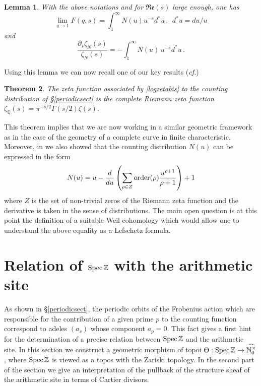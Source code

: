 \documentclass[noams,lp]{compositio}
\newtheorem{thm}{Theorem}[section] %
\newtheorem{lem}[thm]{Lemma}
\def\Spec{{\rm Spec\,}}
\def\N{{\mathbb N}}
\def\Q{{\mathbb Q}}
\def\Z{{\mathbb Z}}
\newcommand{\cf}{{\it cf.}}
\def\nto{\N_0^{\times}}
\def\wnto{{\widehat{\nto}}}
\begin{document}
\begin{lem} \label{compute1}With the above notations and for $\Re\mathfrak e(s)$ large enough, one has
\begin{equation}\label{lim}
    \lim_{q\to 1} F(q,s) = \int_1^\infty N(u)u^{-s}d^*u\,,\ \ d^*u=du/u
\end{equation}
and
\begin{equation}\label{logzetabis}
    \frac{\partial_s\zeta_N(s)}{\zeta_N(s)}=-\int_1^\infty  N(u)\, u^{-s}d^*u\,.
\end{equation}
\end{lem}
Using this lemma we can now recall one of our key results (\cf \cite{CC1, CC2})
\begin{thm}\label{mainthm} The zeta function associated by \eqref{logzetabis} to the counting distribution of \S \ref{periodicsect} is the  {\em complete} Riemann zeta function  $\zeta_\Q(s)=\pi^{-s/2}\Gamma(s/2)\zeta(s)$.
\end{thm}

This theorem implies that we are now working in a similar geometric framework as in the case of the geometry of a complete curve in finite characteristic. Moreover, in \cite{CC1} we also showed that the counting distribution $N(u)$ can be expressed in the form
 $$
N(u)=u-\frac{d}{du}\left(\sum_{\rho\in Z}{\rm order}(\rho)\frac{u^{\rho+1}}{\rho+1}\right)+1
$$
where $Z$ is the set of non-trivial zeros of the Riemann zeta function and the derivative is taken in the sense of  distributions. The main open question is at this point the definition of a suitable Weil cohomology which would allow one to understand the above equality as a Lefschetz formula.

\section{Relation of $\Spec\Z$ with the arithmetic site}\label{sectspz0}

As shown in \S \ref{periodicsect}, the periodic orbits of the Frobenius action which are responsible for the contribution of a given prime $p$ to the counting function correspond to adeles $(a_v)$ whose component $a_p=0$. This fact gives a first hint for the determination of  a precise relation between  $\Spec\Z$ and the arithmetic site. In this section we construct a geometric morphism of topoi $\Theta: \Spec\Z\to \wnto$, where $\Spec\Z$ is viewed as a topos with the Zariski topology. In the second part of the section we give an interpretation of the pullback of the structure sheaf of the arithmetic site in terms of Cartier divisors. 
\end{document}
